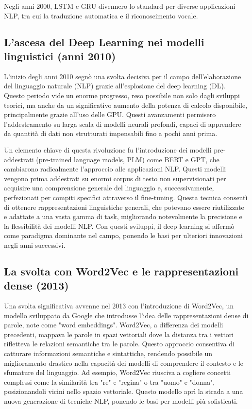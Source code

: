 \documentclass[target=mst,aauheader=,style=]{thud}
\begin{document}
Negli anni 2000, LSTM e GRU divennero lo standard per diverse applicazioni NLP, tra cui la traduzione automatica e il riconoscimento vocale.


\subsection{L’ascesa del Deep Learning nei modelli linguistici (anni 2010)}
L’inizio degli anni 2010 segnò una svolta decisiva per il campo dell’elaborazione del linguaggio naturale (NLP) grazie all’esplosione del deep learning (DL). Questo periodo vide un enorme progresso, reso possibile non solo dagli sviluppi teorici, ma anche da un significativo aumento della potenza di calcolo disponibile, principalmente grazie all’uso delle GPU. Questi avanzamenti permisero l’addestramento su larga scala di modelli neurali profondi, capaci di apprendere da quantità di dati non strutturati impensabili fino a pochi anni prima.

Un elemento chiave di questa rivoluzione fu l’introduzione dei modelli pre-addestrati (pre-trained language models, PLM) come BERT e GPT, che cambiarono radicalmente l’approccio alle applicazioni NLP. Questi modelli vengono prima addestrati su enormi corpus di testo non supervisionati per acquisire una comprensione generale del linguaggio e, successivamente, perfezionati per compiti specifici attraverso il fine-tuning. Questa tecnica consentì di ottenere rappresentazioni linguistiche generali, che potevano essere riutilizzate e adattate a una vasta gamma di task, migliorando notevolmente la precisione e la flessibilità dei modelli NLP. Con questi sviluppi, il deep learning si affermò come paradigma dominante nel campo, ponendo le basi per ulteriori innovazioni negli anni successivi.

\subsection{La svolta con Word2Vec e le rappresentazioni dense (2013)}
Una svolta significativa avvenne nel 2013 con l'introduzione di Word2Vec, un modello sviluppato da Google che introdusse l’idea delle rappresentazioni dense di parole, note come "word embeddings". Word2Vec, a differenza dei modelli precedenti, mappava le parole in spazi vettoriali dove la distanza tra i vettori rifletteva le relazioni semantiche tra le parole. Questo approccio consentiva di catturare informazioni semantiche e sintattiche, rendendo possibile un miglioramento drastico nella capacità dei modelli di comprendere il contesto e le sfumature del linguaggio. Ad esempio, Word2Vec riusciva a cogliere concetti complessi come la similarità tra "re" e "regina" o tra "uomo" e "donna", posizionandoli vicini nello spazio vettoriale. Questo modello aprì la strada a una nuova generazione di tecniche NLP, ponendo le basi per modelli più sofisticati.
\end{document}
